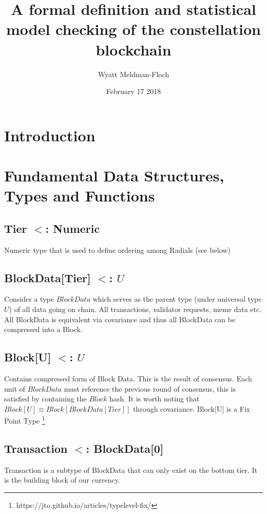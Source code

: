 \documentclass{article}
\title{A formal definition and statistical model checking of the constellation blockchain}
\author{Wyatt Meldman-Floch}
\date{February 17 2018}
\begin{document}
\maketitle

\begin{abstract}


\end{abstract}
\setcounter{secnumdepth}{0}
\section{Introduction}

\section{Fundamental Data Structures, Types and Functions}
\subsection{Tier $<$: Numeric}
Numeric type that is used to define ordering among Radials (see below)

\subsection{BlockData[Tier] $<$: $U$}
Consider a type $BlockData$ which serves as the parent type (under universal type $U$) of all data going on chain. All transactions, validator requests, meme data etc. All BlockData is equivalent via covariance and thus all BlockData can be compressed into a Block.

\subsection{Block[U] $<$: $U$}
Contains compressed form of Block Data. This is the result of consensus. Each unit of $BlockData$ must reference the previous round of consensus, this is satisfied by containing the $Block$ hash. It is worth noting that $Block[U] \equiv Block[BlockData[Tier]]$ through covariance. Block[U] is a Fix Point Type \footnote{https://jto.github.io/articles/typelevel-fix/}

\subsection{Transaction $<$: BlockData[0]}
Transaction is a subtype of BlockData that can only exist on the bottom tier. It is the building block of our currency.
\end{document}
